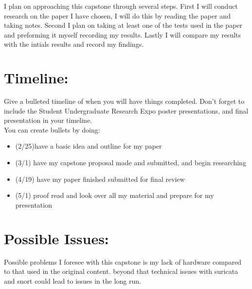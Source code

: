 \documentclass{article}
\begin{document}
\begin{normalsize}
      I plan on approaching this capstone through several steps.  First I will conduct research on the paper I have chosen, I will do this by reading the paper and taking notes. Second I plan on taking at least one of the tests used in the paper and preforming it myself recording my results.  Lastly I will compare my results with the intials results and record my findings.
        
    	\section{Timeline:}
        
        Give a bulleted timeline of when you will have things completed. Don't forget to include the Student Undergraduate Research Expo poster presentations, and final presentation in your timeline. 
        \\
        
        \noindent You can create bullets by doing:
        
        \begin{itemize}
        
\item(2/25)have a basic idea and outline for my paper
\item (3/1) have my capstone proposal made and submitted, and begin researching
\item(4/19) have my paper finished submitted for final review
\item(5/1) proof read and look over all my material and prepare for my presentation
        \end{itemize}
        
    	\section{Possible Issues:}
        Possible problems I foresee with this capstone is my lack of hardware compared to that used in the original content. beyond that technical issues with suricata and snort could lead to issues in the long run.
\end{normalsize}
  
\end{document}
